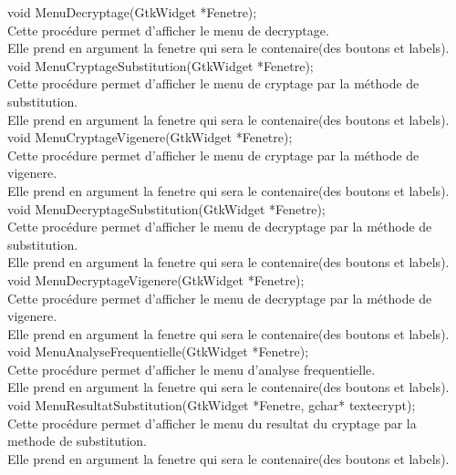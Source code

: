 \documentclass[a4]{article}
\begin{document}
	
	void MenuDecryptage(GtkWidget *Fenetre);\\
		Cette procédure permet d'afficher le menu de decryptage.\\
		Elle prend en argument la fenetre qui sera le contenaire(des boutons et labels).\\

	
	void MenuCryptageSubstitution(GtkWidget *Fenetre);\\
		Cette procédure permet d'afficher le menu de cryptage par la méthode de substitution.\\
		Elle prend en argument la fenetre qui sera le contenaire(des boutons et labels).\\

	
	void MenuCryptageVigenere(GtkWidget *Fenetre);\\
		Cette procédure permet d'afficher le menu de cryptage par la méthode de vigenere.\\
		Elle prend en argument la fenetre qui sera le contenaire(des boutons et labels).\\
	
	void MenuDecryptageSubstitution(GtkWidget *Fenetre);\\
		Cette procédure permet d'afficher le menu de decryptage par la méthode de substitution.\\
		Elle prend en argument la fenetre qui sera le contenaire(des boutons et labels).\\
	
	void MenuDecryptageVigenere(GtkWidget *Fenetre);\\
		Cette procédure permet d'afficher le menu de decryptage par la méthode de vigenere.\\
		Elle prend en argument la fenetre qui sera le contenaire(des boutons et labels).\\
	
	void MenuAnalyseFrequentielle(GtkWidget *Fenetre);\\
		Cette procédure permet d'afficher le menu d'analyse frequentielle.\\
		Elle prend en argument la fenetre qui sera le contenaire(des boutons et labels).\\
	
	void MenuResultatSubstitution(GtkWidget *Fenetre, gchar* textecrypt);\\
		Cette procédure permet d'afficher le menu du resultat du cryptage par la methode de substitution.\\
		Elle prend en argument la fenetre qui sera le contenaire(des boutons et labels).\\
	
\end{document}
